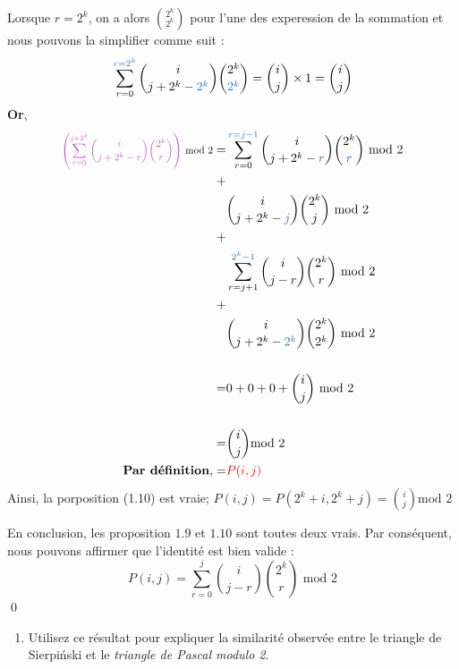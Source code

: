 \documentclass[16pt]{report}
\begin{document}
\begin{multicols*}{2}
\begin{Preuve*}{}{}
        Lorsque $r = 2^k$, on a alors ${2^k \choose 2^k}$ pour l'une des experession de la sommation 
        et nous pouvons la simplifier comme suit :
       \begin{align}
              \sum_{r=0}^{\textcolor{myb}{r=2^k}} {i \choose j + 2^k - \textcolor{myb}{2^k}} {2^k \choose \textcolor{myb}
              {2^k}} = 
              {i \choose j} \times 1  = {i \choose j}
       \end{align}
            \textbf{Or},
              \begin{align*}
               \scalemath{0.8}{
                  \textcolor{myp}{\left( \sum_{r=0}^{j + 2^k} {i \choose j + 2^k-r} 
              {2^k \choose r} \right)} \text{ mod 2}}
         = &\sum_{r=0}^{\textcolor{myb}{r=j-1}} {i \choose j + 2^k- \textcolor{myb}{r}} {2^k \choose \textcolor{myb}{r}} 
         \text{ mod 2} \\ + \\
           &{i \choose j + 2^k - \textcolor{myb}{j}}{2^k \choose j} \text{ mod 2}\\ + \\ 
           &\sum_{r=j+1}^{\textcolor{myb}{2^k -1}} {i \choose j-r} {2^k \choose r} \text{ mod 2 } \\ + \\ 
           &{i \choose j + 2^k - \textcolor{myb}{2^k}}{2^k \choose 2^k}\text{ mod 2}\\ \\
         = &0 + 0 + 0 + {i \choose j}\text{ mod 2}\\   \\ 
         = &{i \choose j} \text{mod 2} \\ 
     \textbf{Par définition}\text{,} = &\textcolor{red}{P(i, j)} 
            \end{align*} 
        Ainsi, la porposition (1.10) est vraie; $P(i, j) = P(2^k +i, 2^k +j) = {i \choose j} \text{mod 2}$ 
        \end{Preuve*}

        En conclusion, les proposition $1.9$ et $1.10$ sont toutes deux vrais. Par conséquent, 
        nous pouvons affirmer que l'identité est bien valide :
            \[ P(i, j) = \sum_{r=0}^{j} {i \choose j-r} {2^k \choose r} \text{ mod } 2   \]
            \qed
        \begin{enumerate}
            \item Utilisez ce résultat pour expliquer la similarité observée entre le triangle de Sierpiński
                et le \textit{triangle de Pascal modulo 2}.
        \end{enumerate}


\end{multicols*}
\end{document}
